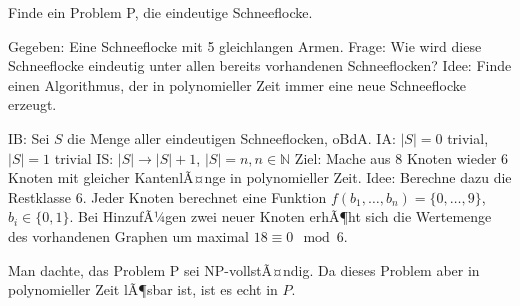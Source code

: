 ﻿\documentclass[preview, border=4pt]{standalone}
\begin{document}

Finde ein Problem P, die eindeutige Schneeflocke.

Gegeben: Eine Schneeflocke mit 5 gleichlangen Armen. \newline
Frage: Wie wird diese Schneeflocke eindeutig unter allen bereits vorhandenen Schneeflocken? \newline
Idee: Finde einen Algorithmus, der in polynomieller Zeit immer eine neue Schneeflocke erzeugt.

IB: Sei $S$ die Menge aller eindeutigen Schneeflocken, oBdA.\newline
IA: $|S| = 0$ trivial, $|S| = 1$ trivial\newline
IS: $|S| \rightarrow |S| + 1$, $|S| = n, n \in \mathbb{N}$\newline
Ziel: Mache aus 8 Knoten wieder 6 Knoten mit gleicher KantenlÃ¤nge in polynomieller Zeit.\newline
Idee: Berechne dazu die Restklasse 6.\newline
Jeder Knoten berechnet eine Funktion $f(b_1, \ldots, b_n) = \{0, \ldots, 9\}$, $b_i \in \{0, 1\}$.\newline
Bei HinzufÃ¼gen zwei neuer Knoten erhÃ¶ht sich die Wertemenge des vorhandenen Graphen um maximal $18\equiv 0 \mod 6$.

Man dachte, das Problem P sei NP-vollstÃ¤ndig. Da dieses Problem aber in polynomieller Zeit lÃ¶sbar ist, ist es echt in $P$. 
\end{document}
